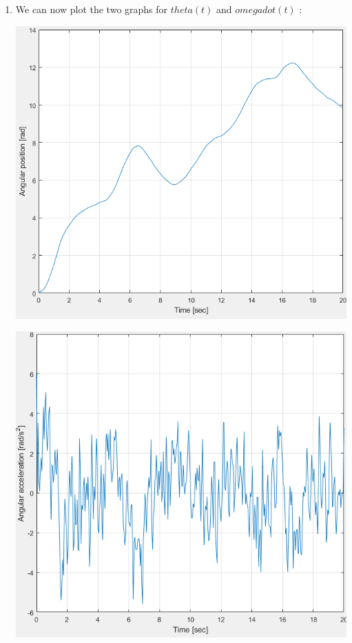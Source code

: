 \documentclass[a4paper,12pt]{article}
\begin{document}
\begin{enumerate}[label={\color{blue}\arabic*)}]
    \item
    We can now plot the two graphs for \(theta(t)\) and \(omega dot(t)\) :
    \begin{multicols}{2}
    \begin{flushleft}
            \includegraphics[width=1\linewidth]{Images/theta.png}
            \label{Figure9}
        \end{flushleft}
    \columnbreak
    \begin{flushright}
            \includegraphics[width=1\linewidth]{Images/omega_dot.png}
            \label{Figure10}
        \end{flushright}


\end{multicols}
\end{enumerate}
\end{document}
